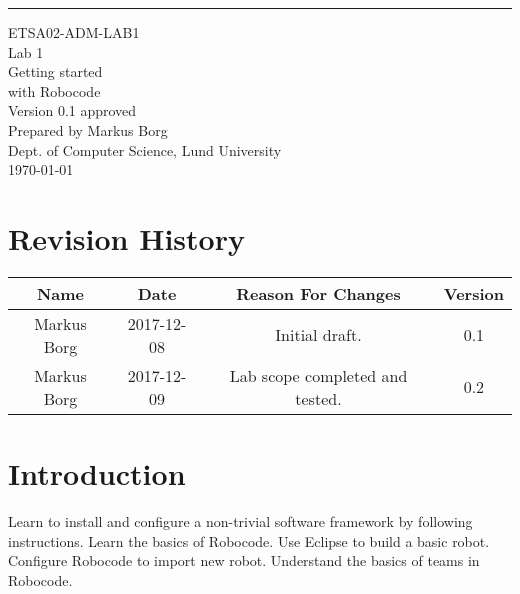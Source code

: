 \documentclass{scrreprt}
\date{}
\def\myversion{0.1 }
\begin{document}
\begin{flushright}
    \rule{16cm}{5pt}\vskip1cm
    \begin{bfseries}
    	\LARGE{ETSA02-ADM-LAB1}\\
    	\vspace{1.5cm}
        \Huge{Lab 1}\\
        \vspace{0.5cm}
        Getting started\\
        \vspace{0.5cm}
        with Robocode\\
        \vspace{1.5cm}
        \LARGE{Version \myversion approved}\\
        \vspace{1.5cm}
        Prepared by Markus Borg\\
        Dept. of Computer Science, Lund University\\
        \vspace{1.5cm}
        \today\\
    \end{bfseries}
\end{flushright}


\chapter*{Revision History}

\begin{center}
    \begin{tabular}{|c|c|c|c|}
        \hline
	    Name & Date & Reason For Changes & Version\\
        \hline
	    Markus Borg & 2017-12-08 & Initial draft. & 0.1\\
        \hline
        Markus Borg & 2017-12-09 & Lab scope completed and tested. & 0.2\\
        \hline
    \end{tabular}
\end{center}

\chapter{Introduction}
Learn to install and configure a non-trivial software framework by following instructions.
Learn the basics of Robocode.
Use Eclipse to build a basic robot.
Configure Robocode to import new robot.
Understand the basics of teams in Robocode.
\end{document}
